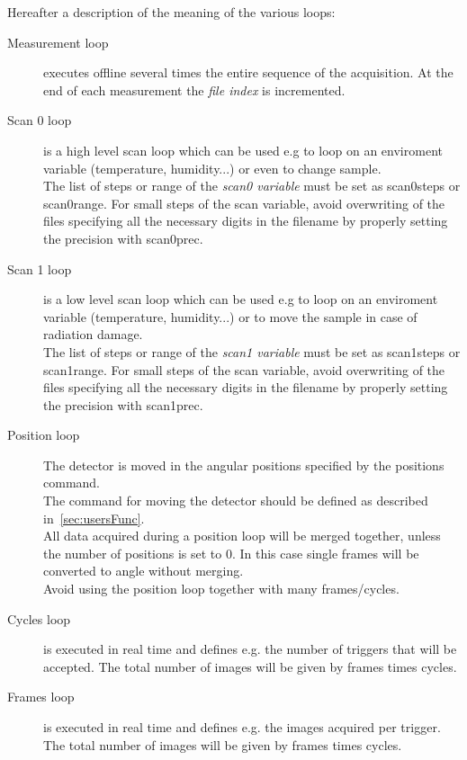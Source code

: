 Hereafter a description of the meaning of the various loops:
\begin{description}
\item[Measurement loop] executes offline several times the entire sequence of the acquisition. At the end of each measurement the \textit{file index} is incremented.

\item[Scan 0 loop]
  is a high level scan loop which can be used e.g to loop on an enviroment variable (temperature, humidity...) or even to change sample.\\
 The list of steps or range of the \textit{scan0 variable} must be set as scan0steps or scan0range. For small steps of the scan variable, avoid overwriting of the files specifying all the necessary digits in the filename by properly setting the precision with scan0prec.

\item[Scan 1 loop]
  is a low level scan loop which can be used e.g to loop on an enviroment variable (temperature, humidity...) or to move the sample in case of radiation damage.\\
 The list of steps or range of the \textit{scan1 variable} must be set as scan1steps or scan1range. For small steps of the scan variable, avoid overwriting of the files specifying all the necessary digits in the filename by properly setting the precision with scan1prec.

\item[Position loop]
 The detector is moved in the angular positions specified by the positions command.\\
 The command for moving the detector should be defined as described in~\ref{sec:usersFunc}.\\
 All data acquired during a position loop will be merged together, unless the number of positions is set to 0. In this case single frames will be converted to angle without merging.\\
 Avoid using the position loop together with many frames/cycles.

\item[Cycles loop] is executed in real time and defines e.g. the number of triggers that will be accepted. The total number of images will be given by frames times cycles.

\item[Frames loop] is executed in real time and defines e.g. the images acquired per trigger. The total number of images will be given by frames times cycles.
\end{description}

